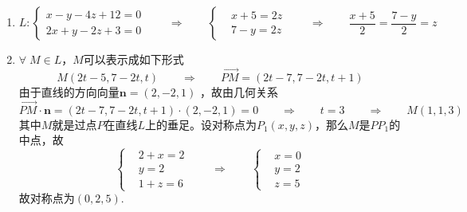 \begin{enumerate}
    \item \[L : \left\{\begin{aligned}
        x - y - 4z + 12 = 0 \\ 2x + y - 2z + 3 = 0
    \end{aligned}\right.\qquad \Longrightarrow\qquad \left\{\begin{aligned}
        &x + 5 = 2z \\ & 7 - y = 2z
    \end{aligned}\right.\qquad\Longrightarrow\qquad \frac{x + 5}{2} = \frac{7 - y}{2} = z\]

    \item \(\forall\; M \in L\)，\(M\)可以表示成如下形式\[M(2t - 5 , 7 - 2t, t)\qquad\Longrightarrow\qquad\overrightarrow{PM} = (2t - 7, 7 - 2t, t + 1) \]
    由于直线的方向向量\(\boldsymbol{n} = (2, -2, 1)\)
    ，故由几何关系\[\overrightarrow{PM}\cdot \boldsymbol{n} = (2t - 7, 7 - 2t, t + 1)\cdot(2, -2, 1) = 0\qquad \Longrightarrow\qquad t = 3 \qquad \Longrightarrow\qquad M(1, 1, 3)\]
    其中\(M\)就是过点\(P\)在直线\(L\)上的垂足。设对称点为\(P_1(x, y, z)\)，那么\(M\)是\(PP_1\)的中点，故\[\left\{\begin{aligned}
        &2 + x = 2 \\ & y = 2 \\ &1 + z = 6
    \end{aligned}\right. \qquad\Longrightarrow\qquad \left\{\begin{aligned}
        &x = 0 \\ & y = 2 \\ & z = 5
    \end{aligned}\right.\]
    故对称点为\((0, 2, 5).\)
    
\end{enumerate}